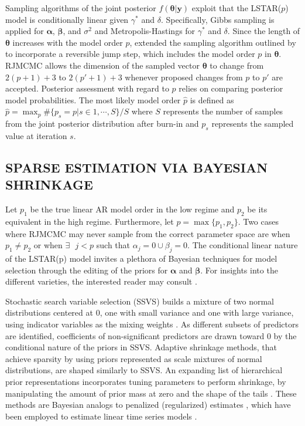 Sampling algorithms of the joint posterior $f(\bm{\theta}|\bm{y})$ exploit that the LSTAR($p$) model is conditionally linear given $\gamma^*$ and $\delta$. Specifically, Gibbs sampling is applied for $\bm{\alpha}$, $\bm{\beta}$, and $\sigma^2$  \citep{Gelfand1990} and Metropolis-Hastings \citep{Metropolis1953,Hastings1970} for $\gamma^*$ and $\delta$. Since the length of $\bm{\theta}$ increases with the model order $p$, \cite{Lopes2006} extended the sampling algorithm outlined by \cite{Lubrano2000} to incorporate a reversible jump step, which includes the model order $p$ in $\bm{\theta}$. RJMCMC allows the dimension of the sampled vector $\bm{\theta}$ to change from $2(p+1)+3$ to $2(p'+1)+3$ whenever proposed changes from $p$ to $p'$ are accepted. Posterior assessment with regard to $p$ relies on comparing  posterior model probabilities. The most likely model order $\hat{p}$ is defined as $\hat{p}=\max_{p}\#\{p_s=p| s \in {1,\cdots, S}\}/S$  where $S$ represents the number of samples from the joint posterior distribution after burn-in and $p_s$ represents the sampled value at iteration $s$. 

\subsection{SPARSE ESTIMATION VIA BAYESIAN SHRINKAGE}
Let $p_1$ be the true linear AR model order in the low regime and $p_2$ be its equivalent in the high regime. Furthermore, let $p=\max\{p_1, p_2\}$. Two cases where RJMCMC may never sample from the correct parameter space are when $p_1\neq p_2$ or when $\exists \textrm{ } j <p$ such that $\alpha_j=0 \cup \beta_j=0$. The conditional linear nature of the LSTAR(p) model invites a plethora of Bayesian techniques for model selection through the editing of the priors for $\bm{\alpha}$ and $\bm{\beta}$. For insights into the different varieties, the interested reader may consult \cite{OHara2009}. 

Stochastic search variable selection (SSVS) builds a mixture of two normal distributions centered at 0, one with small variance and one with large variance, using indicator variables as the mixing weights \citep{George1993}. As different subsets of predictors are identified, coefficients of non-significant predictors are drawn toward 0 by the conditional nature of the priors in SSVS. Adaptive shrinkage methods, that achieve sparsity by using priors represented as scale mixtures of normal distributions, are shaped similarly to SSVS. An expanding list of hierarchical prior representations incorporates tuning parameters to perform shrinkage, by manipulating the amount of prior mass at zero and the shape of the tails \citep{Polson2010}. These methods are Bayesian analogs to penalized (regularized) estimates \citep{Tibshirani1996}, which have been employed to estimate linear time series models \citep{Konzen2016,Nardi2011}. 

